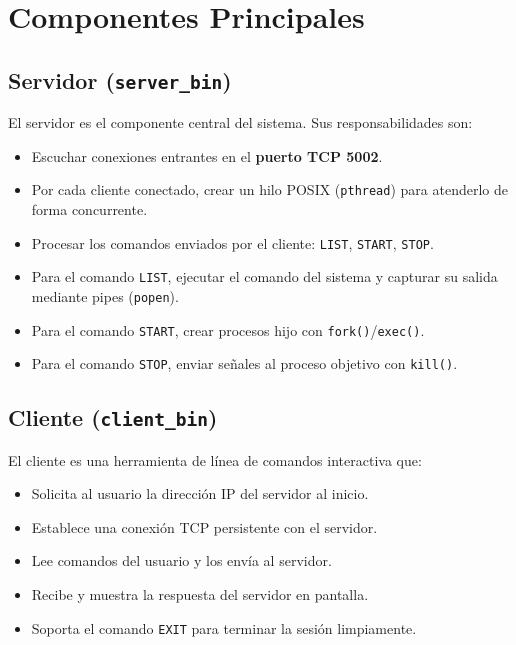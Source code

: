 \documentclass[12pt,a4paper]{report}
\begin{document}
\section{Componentes Principales}

\subsection{Servidor (\texttt{server\_bin})}

El servidor es el componente central del sistema. Sus responsabilidades son:

\begin{itemize}[leftmargin=1.5em]
  \item Escuchar conexiones entrantes en el \textbf{puerto TCP 5002}.
  \item Por cada cliente conectado, crear un hilo POSIX (\texttt{pthread}) para atenderlo de forma concurrente.
  \item Procesar los comandos enviados por el cliente: \texttt{LIST}, \texttt{START}, \texttt{STOP}.
  \item Para el comando \texttt{LIST}, ejecutar el comando del sistema y capturar su salida mediante pipes (\texttt{popen}).
  \item Para el comando \texttt{START}, crear procesos hijo con \texttt{fork()}/\texttt{exec()}.
  \item Para el comando \texttt{STOP}, enviar señales al proceso objetivo con \texttt{kill()}.
\end{itemize}

\subsection{Cliente (\texttt{client\_bin})}

El cliente es una herramienta de línea de comandos interactiva que:

\begin{itemize}[leftmargin=1.5em]
  \item Solicita al usuario la dirección IP del servidor al inicio.
  \item Establece una conexión TCP persistente con el servidor.
  \item Lee comandos del usuario y los envía al servidor.
  \item Recibe y muestra la respuesta del servidor en pantalla.
  \item Soporta el comando \texttt{EXIT} para terminar la sesión limpiamente.
\end{itemize}
\end{document}
